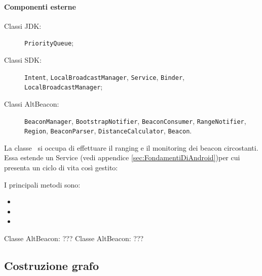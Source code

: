 \documentclass[../Funzionalita.tex]{subfiles}
\begin{document}
			\paragraph*{Componenti esterne}
			\begin{description}
				\item[Classi JDK:] \verb|PriorityQueue|;
				\item[Classi SDK:] \verb|Intent|, \verb|LocalBroadcastManager|, \verb|Service|, \verb|Binder|, \\ \verb|LocalBroadcastManager|;
				\item[Classi AltBeacon:] \verb|BeaconManager|, \verb|BootstrapNotifier|, \verb|BeaconConsumer|, \verb|RangeNotifier|, \verb|Region|, \verb|BeaconParser|,  \verb|DistanceCalculator|, \verb|Beacon|.
			\end{description}
			
			
			La classe \BeaconManagerAdapter\ si occupa di effettuare il ranging e il monitoring dei beacon circostanti. 
			Essa estende un Service (vedi appendice \ref{sec:FondamentiDiAndroid})per cui presenta un ciclo di vita così gestito:
			
			
			
			
			
			
			I principali metodi sono:
			\begin{itemize}
				\item 
				\item 
				\item 
			\end{itemize}						
			
			Classe AltBeacon:
				???
			Classe AltBeacon:
				???
			
		\subsection{Costruzione grafo}
		
		
		
\end{document}
